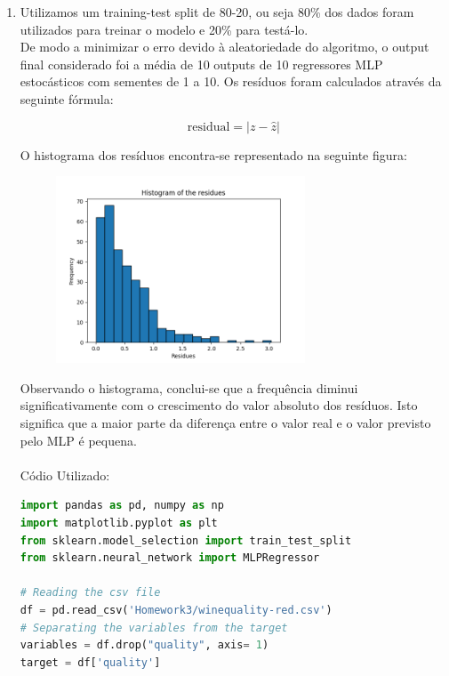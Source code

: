 \documentclass[a4paper,12pt]{article} %
\begin{document}
\begin{enumerate}

\item Utilizamos um training-test split de 80-20, ou seja 80\% dos dados foram utilizados para treinar o modelo e 20\% para testá-lo.\\ 
De modo a minimizar o erro devido à aleatoriedade do algoritmo, o output final considerado foi a média de 10 outputs de 10 regressores MLP estocásticos com sementes de 1 a 10.
Os resíduos foram calculados através da seguinte fórmula:

\begin{equation}
    \text{residual} = | z - \hat{z} |
\end{equation}

O histograma dos resíduos encontra-se representado na seguinte figura:

\begin{figure}[H]
    \centering
    \includegraphics[width=0.7\textwidth]{ex1_histogram.png}
\end{figure}

Observando o histograma, conclui-se que a frequência diminui significativamente 
com o crescimento do valor absoluto dos resíduos. Isto significa que a maior parte
da diferença entre o valor real e o valor previsto pelo MLP é pequena.\\ \\

Códio Utilizado:

\begin{lstlisting}[language=Python]
import pandas as pd, numpy as np
import matplotlib.pyplot as plt
from sklearn.model_selection import train_test_split
from sklearn.neural_network import MLPRegressor

# Reading the csv file
df = pd.read_csv('Homework3/winequality-red.csv')
# Separating the variables from the target
variables = df.drop("quality", axis= 1)
target = df['quality']


\end{lstlisting}
\end{enumerate}
\end{document}
